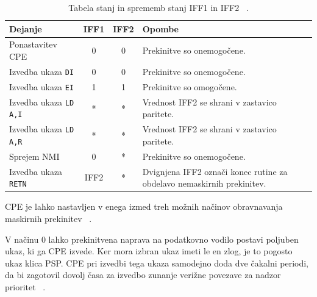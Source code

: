 \documentclass[a4paper, 12pt, openright]{book}
\begin{document}
    \begin{table}[htb]
        \begin{center}
            \begin{tabular}{|p{}|c|c|p{}|}
                \hline
                \textbf{Dejanje}              & \textbf{IFF1} & \textbf{IFF2} & \textbf{Opombe}                                                        \\
                \hline
                Ponastavitev CPE              & 0             & 0             & Prekinitve so onemogočene.                                             \\
                \hline
                Izvedba ukaza \texttt{DI}     & 0             & 0             & Prekinitve so onemogočene.                                             \\
                \hline
                Izvedba ukaza \texttt{EI}     & 1             & 1             & Prekinitve so omogočene.                                               \\
                \hline
                Izvedba ukaza \texttt{LD A,I} & *             & *             & Vrednost IFF2 se shrani v zastavico paritete.                          \\
                \hline
                Izvedba ukaza \texttt{LD A,R} & *             & *             & Vrednost IFF2 se shrani v zastavico paritete.                          \\
                \hline
                Sprejem NMI                   & 0             & *             & Prekinitve so onemogočene.                                             \\
                \hline
                Izvedba ukaza \texttt{RETN}   & IFF2          & *             & Dvignjena IFF2 označi konec rutine za obdelavo nemaskirnih prekinitev. \\
                \hline
            \end{tabular}
        \end{center}
        \caption{Tabela stanj in sprememb stanj IFF1 in IFF2 ~\cite{z80cpuusermanual}.}
        \label{z80cpuusermanual_tab2}
    \end{table}

    CPE je lahko nastavljen v enega izmed treh možnih načinov obravnavanja maskirnih
    prekinitev ~\cite{z80cpuusermanual}.

    V načinu 0 lahko prekinitvena naprava na podatkovno vodilo postavi poljuben
    ukaz, ki ga CPE izvede. Ker mora izbran ukaz imeti le en zlog, je to pogosto ukaz
    klica PSP. CPE pri izvedbi tega ukaza samodejno doda dve čakalni periodi, da bi
    zagotovil dovolj časa za izvedbo zunanje verižne povezave za nadzor prioritet
    ~\cite{z80cpuusermanual}.
\end{document}
